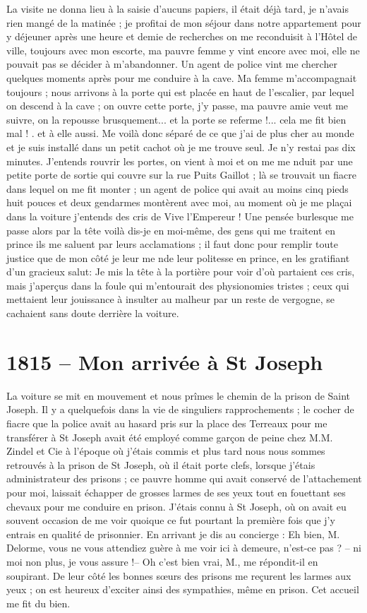\documentclass[11pt,a4paper]{report}
\begin{document}
La visite ne donna lieu à la saisie d'aucuns papiers, il était déjà tard, je n'avais rien mangé de la matinée ; je profitai de mon séjour dans notre appartement pour y déjeuner après une heure et demie de recherches on me reconduisit à l'Hôtel de ville, toujours avec mon escorte, ma pauvre femme y vint encore avec moi, elle ne pouvait pas se décider à m'abandonner. Un agent de police vint me chercher quelques moments après pour me conduire à la cave. Ma femme m'accompagnait toujours ; nous arrivons à la porte qui est placée en haut de l'escalier, par lequel on descend à la cave ; on ouvre cette porte, j'y passe, ma pauvre amie veut me suivre, on la repousse brusquement... et la porte se referme !... cela me fit bien mal ! . et à elle aussi. Me voilà donc séparé de ce que j'ai de plus cher au monde et je suis installé dans un petit cachot où je me trouve seul. Je n'y restai pas dix minutes. J'entends rouvrir les portes, on vient à moi et on me me nduit par une petite porte de sortie qui couvre sur la rue Puits Gaillot ; là se trouvait un fiacre dans lequel on me fit monter ; un agent de police qui avait au moins cinq pieds huit pouces et deux gendarmes montèrent avec moi, au moment où je me plaçai dans la voiture j'entends des cris de Vive l'Empereur ! Une pensée burlesque me passe alors par la tête voilà dis-je en moi-même, des gens qui me traitent en prince ils me saluent par leurs acclamations ; il faut donc pour remplir toute justice que de mon côté je leur me nde leur politesse en prince, en les gratifiant d'un gracieux salut: Je mis la tête à la portière pour voir d'où partaient ces cris, mais j'aperçus dans la foule qui m'entourait des physionomies tristes ; ceux qui mettaient leur jouissance à insulter au malheur par un reste de vergogne, se cachaient sans doute derrière la voiture.

\section*{1815 -- Mon arrivée à St Joseph}

La voiture se mit en mouvement et nous prîmes le chemin de la prison de Saint Joseph. Il y a quelquefois dans la vie de singuliers rapprochements ; le cocher de fiacre que la police avait au hasard pris sur la place des Terreaux pour me transférer à St Joseph avait été employé comme garçon de peine chez M.M. Zindel et Cie à l'époque où j'étais commis et plus tard nous nous sommes retrouvés à la prison de St Joseph, où il était porte clefs, lorsque j'étais administrateur des prisons ; ce pauvre homme qui avait conservé de l'attachement pour moi, laissait échapper de grosses larmes de ses yeux tout en fouettant ses chevaux pour me conduire en prison. J'étais connu à St Joseph, où on avait eu souvent occasion de me voir quoique ce fut pourtant la première fois que j'y entrais en qualité de prisonnier. En arrivant je dis au concierge : Eh bien, M. Delorme, vous ne vous attendiez guère à me voir ici à demeure, n'est-ce pas ? -- ni moi non plus, je vous assure !-- Oh c'est bien vrai, M., me répondit-il en soupirant. De leur côté les bonnes sœurs des prisons me reçurent les larmes aux yeux ; on est heureux d'exciter ainsi des sympathies, même en prison. Cet accueil me fit du bien.
\end{document}
